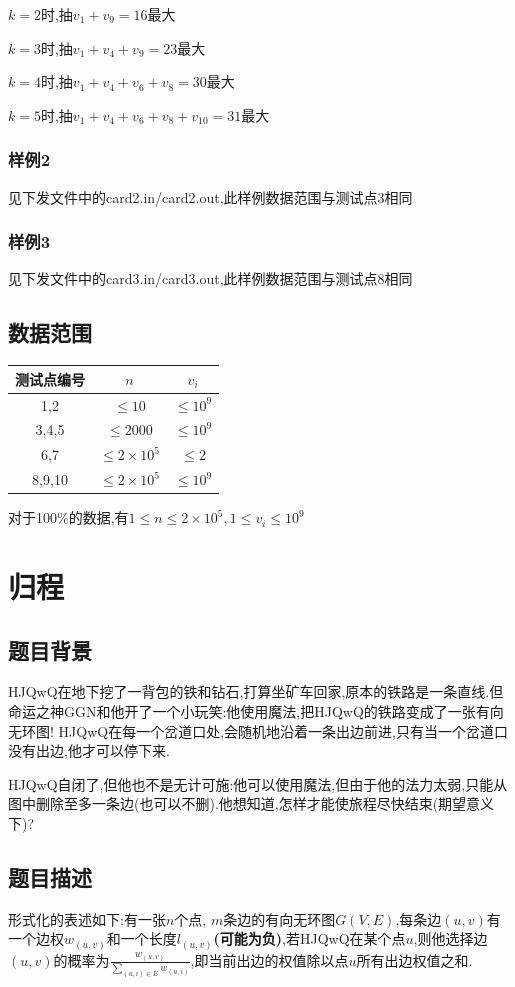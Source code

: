 \documentclass[12pt]{ctexart}
\begin{document}
	$k=2$时,抽$v_1+v_9=16$最大

	$k=3$时,抽$v_1+v_4+v_9=23$最大

	$k=4$时,抽$v_1+v_4+v_6+v_8=30$最大

	$k=5$时,抽$v_1+v_4+v_6+v_8+v_{10}=31$最大
	\subsubsection{样例2}
	见下发文件中的card2.in/card2.out,此样例数据范围与测试点3相同
	\subsubsection{样例3}
	见下发文件中的card3.in/card3.out,此样例数据范围与测试点8相同
	\subsection{数据范围}
	\begin{center}
		\begin{tabular}{|c|c|c|}
			\hline 测试点编号&$n$&$v_i$\\
			\hline 1,2&$\le10$&$\le10^9$\\
			\hline 3,4,5&$\le2000$&$\le10^9$\\
			\hline 6,7&$\le2\times10^5$&$\le2$\\
			\hline 8,9,10&$\le2\times10^5$&$\le10^9$\\
			\hline
		\end{tabular}
	\end{center}
	对于100\%的数据,有$1\le n\le2\times10^5,1\le v_i\le10^9$
	\newpage
	\section{归程}
	\subsection{题目背景}
	HJQwQ在地下挖了一背包的铁和钻石,打算坐矿车回家,原本的铁路是一条直线.但命运之神GGN和他开了一个小玩笑:他使用魔法,把HJQwQ的铁路变成了一张有向无环图! HJQwQ在每一个岔道口处,会随机地沿着一条出边前进,只有当一个岔道口没有出边,他才可以停下来.

	HJQwQ自闭了,但他也不是无计可施:他可以使用魔法,但由于他的法力太弱,只能从图中删除至多一条边(也可以不删).他想知道,怎样才能使旅程尽快结束(期望意义下)?
	\subsection{题目描述}
	形式化的表述如下:有一张$n$个点, $m$条边的有向无环图$G(V,E)$,每条边$(u,v)$有一个边权$w_{(u,v)}$和一个长度$l_{(u,v)}$\textbf{(可能为负)},若HJQwQ在某个点$u$,则他选择边$(u,v)$的概率为$\frac{w_{(u,v)}}{\sum\limits_{(u,i)\in E}w_{(u,i)}}$,即当前出边的权值除以点$u$所有出边权值之和.
\end{document}

